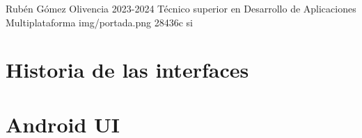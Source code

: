\documentclass{\ClassPath/yukibook}
\begin{document}
    {Rubén Gómez Olivencia}  %
    {2023-2024}    %
    {Técnico superior en \linebreak Desarrollo de  Aplicaciones Multiplataforma} %
    {}%
    {}%
    {img/portada.png} %
    {28436c}
    {si} %


    \coverpage
    \graphicspath{{../../../yukibook.cls/}}
    \licensepage

    \tableofcontents


    \part{Historia de las interfaces}
    \graphicspath{{./img/di/tema_1}}
    


    \part{Android UI}
    \graphicspath{{./img/di/tema_2}}
    





%    
\end{document}
